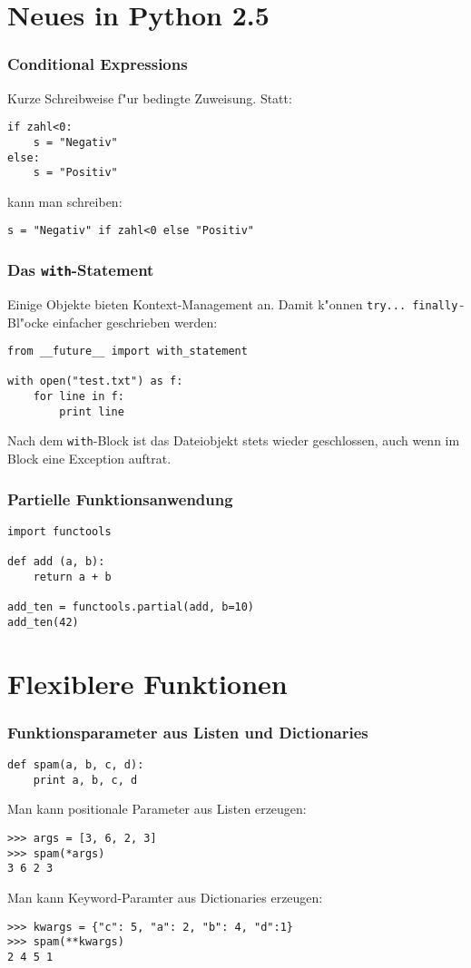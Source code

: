 \section{Neues in Python 2.5}

\begin{frame}[fragile]
\frametitle{Conditional Expressions}
Kurze Schreibweise f"ur bedingte Zuweisung. Statt:
\begin{lstlisting}
if zahl<0:
    s = "Negativ"
else:
    s = "Positiv"
\end{lstlisting}
kann man schreiben:
\begin{lstlisting}
s = "Negativ" if zahl<0 else "Positiv"
\end{lstlisting}
\end{frame}

\begin{frame}[fragile]
\frametitle{Das \texttt{with}-Statement}
Einige Objekte bieten Kontext-Management an. Damit k"onnen \lstinline{try... finally}\,-Bl"ocke einfacher geschrieben werden:
\begin{lstlisting}
from __future__ import with_statement

with open("test.txt") as f:
    for line in f:
        print line
\end{lstlisting}
Nach dem \lstinline{with}-Block ist das Dateiobjekt stets wieder geschlossen, auch wenn im Block eine Exception auftrat.
\end{frame}

\begin{frame}[fragile]
\frametitle{Partielle Funktionsanwendung}
\begin{lstlisting}
import functools

def add (a, b):
    return a + b

add_ten = functools.partial(add, b=10)
add_ten(42)
\end{lstlisting}
\end{frame}

\section{Flexiblere Funktionen}

\begin{frame}[fragile]
\frametitle{Funktionsparameter aus Listen und Dictionaries}
\begin{lstlisting}
def spam(a, b, c, d):
    print a, b, c, d
\end{lstlisting}
Man kann positionale Parameter aus Listen erzeugen:
\begin{lstlisting}[style=Shell]
>>> args = [3, 6, 2, 3]
>>> spam(*args)
3 6 2 3
\end{lstlisting}
Man kann Keyword-Paramter aus Dictionaries erzeugen:
\begin{lstlisting}[style=Shell]
>>> kwargs = {"c": 5, "a": 2, "b": 4, "d":1}
>>> spam(**kwargs)
2 4 5 1
\end{lstlisting}
\end{frame}

